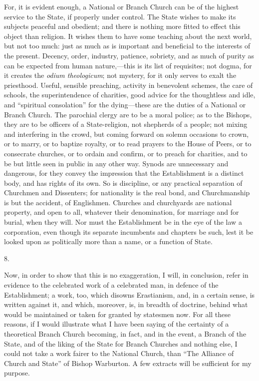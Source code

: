 For, it is evident enough, a National or Branch Church can be of
the highest service to the State, if properly under control. The State
wishes to make its subjects peaceful and obedient; and there is
nothing more fitted to effect this object than religion. It wishes
them to have some teaching about the next world, but not too much:
just as much as is important and beneficial to the interests of the
present. Decency, order, industry, patience, sobriety, and as much of
purity as can be expected from human nature,—this is its list of
requisites; not dogma, for it creates the \emph{odium theologicum};
not mystery, for it only serves to exalt the priesthood. Useful,
sensible preaching, activity in benevolent schemes, the care of
schools, the superintendence of charities, good advice for the
thoughtless and idle, and ``spiritual consolation'' for the
dying—these are the duties of a National or Branch Church. The
parochial clergy are to be a moral police; as to the Bishops, they are
to be officers of a State-religion, not shepherds of a people; not
mixing and interfering in the crowd, but coming forward on solemn
occasions to crown, or to marry, or to baptize royalty, or to read
prayers to the House of Peers, or to consecrate churches, or to ordain
and confirm, or to preach for charities, and to be but little seen in
public in any other way. Synods are unnecessary and dangerous, for
they convey the impression that the Establishment is a distinct body,
and has rights of its own. So is discipline, or any practical
separation of Churchmen and Dissenters; for nationality is the real
bond, and Churchmanship is but the accident, of Englishmen. Churches
and churchyards are national property, and open to all, whatever their
denomination, for marriage and for burial, when they will. Nor must
the Establishment be in the eye of the law a corporation, even though
its separate incumbents and chapters be such, lest it be looked upon
as politically more than a name, or a function of State.

8.

Now, in order to show that this is no exaggeration, I will, in
conclusion, refer in evidence to the celebrated work of a celebrated
man, in defence of the Establishment; a work, too, which disowns
Erastianism, and, in a certain sense, is written against it, and
which, moreover, is, in breadth of doctrine, behind what would be
maintained or taken for granted by statesmen now. For all these
reasons, if I would illustrate what I have been saying of the
certainty of a theoretical Branch Church becoming, in fact, and in the
event, a Branch of the State, and of the liking of the State for
Branch Churches and nothing else, I could not take a work fairer to
the National Church, than ``The Alliance of Church and State''
of Bishop Warburton. A few extracts will be sufficient for my purpose.

